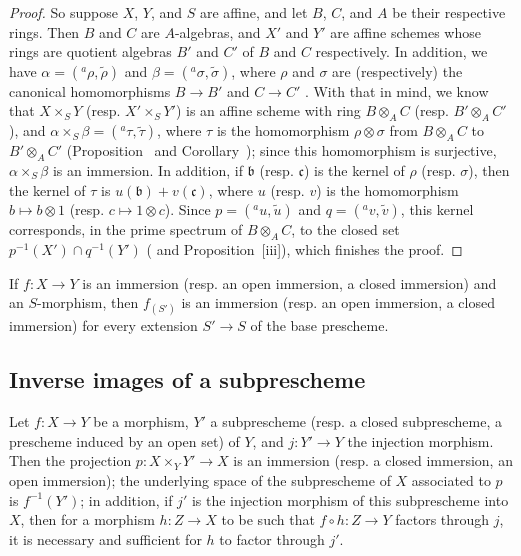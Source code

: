 \begin{proof}
So suppose $X$, $Y$, and $S$ are affine, and let $B$, $C$, and $A$ be their respective rings.
Then $B$ and $C$ are $A$-algebras, and $X'$ and $Y'$ are affine schemes whose rings are quotient algebras $B'$ and $C'$ of $B$ and $C$ respectively.
In addition, we have $\alpha=({}^a\rho,\widetilde{\rho})$ and $\beta=({}^a\sigma,\widetilde{\sigma})$, where $\rho$ and $\sigma$ are (respectively) the canonical homomorphisms $B\to B'$ and $C\to C'$ .
With that in mind, we know that $X\times_S Y$ (resp. $X'\times_S Y'$) is an affine scheme with ring $B\otimes_A C$ (resp. $B'\otimes_A C'$), and $\alpha\times_S\beta=({}^a\tau,\widetilde{\tau})$, where $\tau$ is the homomorphism $\rho\otimes\sigma$ from $B\otimes_A C$ to $B'\otimes_A C'$ (Proposition~ and Corollary~);
since this homomorphism is surjective, $\alpha\times_S\beta$ is an immersion.
In addition, if $\mathfrak{b}$ (resp. $\mathfrak{c}$) is the kernel of $\rho$ (resp. $\sigma$), then the kernel of $\tau$ is $u(\mathfrak{b})+v(\mathfrak{c})$, where $u$ (resp. $v$) is the homomorphism $b\mapsto b\otimes 1$ (resp. $c\mapsto 1\otimes c$).
Since $p=({}^a u,\widetilde{u})$ and $q=({}^a v,\widetilde{v})$, this kernel corresponds, in the prime spectrum of $B\otimes_A C$, to the closed set $p^{-1}(X')\cap q^{-1}(Y')$ ( and Proposition~[iii]), which finishes the proof.
\end{proof}

\begin{corollary}[4.3.2]
\label{I.4.3.2}
If $f:X\to Y$ is an immersion (resp. an open immersion, a closed immersion) and an $S$-morphism, then $f_{(S')}$ is an immersion (resp. an open immersion, a closed immersion) for every extension $S'\to S$ of the base prescheme.
\end{corollary}

\subsection{Inverse images of a subprescheme}
\label{subsection:I.4.4}

\begin{proposition}[4.4.1]
\label{I.4.4.1}
Let $f:X\to Y$ be a morphism, $Y'$ a subprescheme (resp. a closed subprescheme, a prescheme induced by an open set) of $Y$, and $j:Y'\to Y$ the injection morphism.
Then the projection $p:X\times_Y Y'\to X$ is an immersion (resp. a closed immersion, an open immersion);
the underlying space of the subprescheme of $X$ associated to $p$ is $f^{-1}(Y')$;
in addition, if $j'$ is the injection morphism of this subprescheme into $X$, then for a morphism $h:Z\to X$ to be such that $f\circ h:Z\to Y$ factors through $j$, it is necessary and sufficient for $h$ to factor through $j'$.
\end{proposition}

